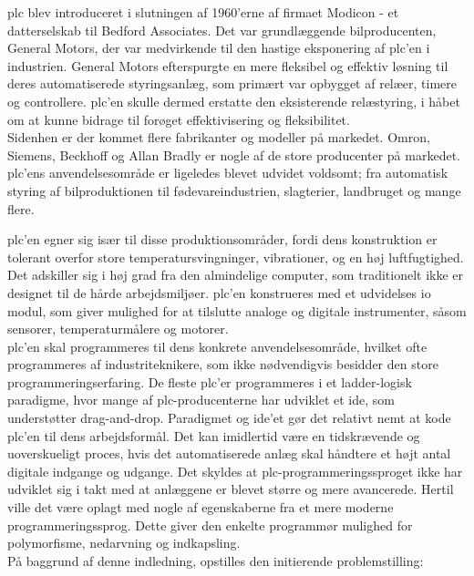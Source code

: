 \gls{plc} blev introduceret i slutningen af 1960'erne af firmaet Modicon - et datterselskab til Bedford Associates. Det var grundlæggende bilproducenten, General Motors, der var medvirkende til den hastige eksponering af \gls{plc}'en i industrien. General Motors efterspurgte en mere fleksibel og effektiv løsning til deres automatiserede styringsanlæg, som primært var opbygget af relæer, timere og controllere. \gls{plc}'en skulle dermed erstatte den eksisterende relæstyring, i håbet om at kunne bidrage til forøget effektivisering og fleksibilitet. \\

\noindent Sidenhen er der kommet flere fabrikanter og modeller på markedet. Omron, Siemens, Beckhoff og Allan Bradly er nogle af de store producenter på markedet. \gls{plc}'ens anvendelsesområde er ligeledes blevet udvidet voldsomt; fra automatisk styring af bilproduktionen til fødevareindustrien, slagterier, landbruget og mange flere. 

\noindent \gls{plc}'en egner sig især til disse produktionsområder, fordi dens konstruktion er tolerant overfor store temperatursvingninger, vibrationer, og en høj luftfugtighed. Det adskiller sig i høj grad fra den almindelige computer, som traditionelt ikke er designet til de hårde arbejdsmiljøer. \gls{plc}'en konstrueres med et udvidelses \gls{io} modul, som giver mulighed for at tilslutte analoge og digitale instrumenter, såsom sensorer, temperaturmålere og motorer. \\

\noindent \gls{plc}'en skal programmeres til dens konkrete anvendelsesområde, hvilket ofte programmeres af industriteknikere, som ikke nødvendigvis besidder den store programmeringserfaring. De fleste \gls{plc}'er programmeres i et ladder-logisk paradigme, hvor mange af \gls{plc}-producenterne har udviklet et \gls{ide}, som understøtter drag-and-drop. Paradigmet og \gls{ide}'et gør det relativt nemt at kode \gls{plc}'en til dens arbejdsformål. Det kan imidlertid være en tidskrævende og uoverskueligt proces, hvis det automatiserede anlæg skal håndtere et højt antal digitale indgange og udgange. Det skyldes at \gls{plc}-programmeringssproget ikke har udviklet sig i takt med at anlæggene er blevet større og mere avancerede. Hertil ville det være oplagt med nogle af egenskaberne fra et mere moderne programmeringssprog. Dette giver den enkelte programmør mulighed for polymorfisme, nedarvning og indkapsling. \\

\noindent På baggrund af denne indledning, opstilles den initierende problemstilling: \\

